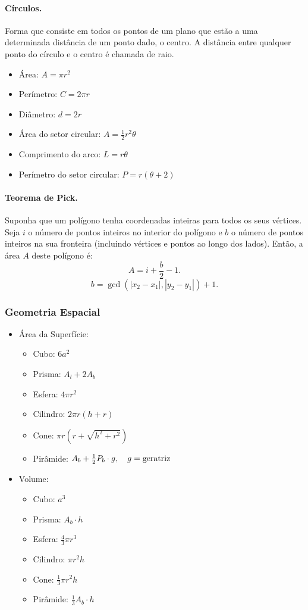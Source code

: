 \paragraph{Círculos.} Forma que consiste em todos os pontos de um plano que estão a uma determinada distância de um ponto dado, o centro. A distância entre qualquer ponto do círculo e o centro é chamada de raio.

	\begin{itemize}
		\item Área: $A = \pi r^2$
		\item Perímetro: $C = 2\pi r$
		\item Diâmetro: $d = 2r$
		\item Área do setor circular: $A = \frac{1}{2}r^2\theta$
		\item Comprimento do arco: $L = r\theta$
		\item Perímetro do setor circular: $P = r(\theta+2)$
	\end{itemize}

\paragraph{Teorema de Pick.} Suponha que um polígono tenha coordenadas inteiras para todos os seus vértices. Seja $i$ o número de pontos inteiros no interior do polígono e $b$ o número de pontos inteiros na sua fronteira (incluindo vértices e pontos ao longo dos lados). Então, a área $A$ deste polígono é:
$$A = i + \frac{b}{2} -1.$$
$$b = \gcd(|x_2-x_1|,|y_2-y_1|)+1.$$

\subsubsection{Geometria Espacial}


	\begin{itemize}
		\item Área da Superfície:
		\begin{itemize}
			\item Cubo: $6a^2$
			\item Prisma: $A_l + 2A_b$
			\item Esfera: $4\pi r^2$
			\item Cilindro: $2\pi r(h+r)$
			\item Cone: $\pi r(r+\sqrt{h^2+r^2})$
			\item Pirâmide: $A_b+\frac{1}{2}P_b \cdot g, \quad g=\textnormal{geratriz}$
		\end{itemize}

		\item Volume:
		\begin{itemize}
			\item Cubo: $a^3$
			\item Prisma: $A_b\cdot h$
			\item Esfera: $\frac{4}{3} \pi r^3$
			\item Cilindro: $\pi r^2h$
			\item Cone: $\frac{1}{3} \pi r^2 h$
			\item Pirâmide: $\frac{1}{3} A_b\cdot h$
		\end{itemize}

	\end{itemize}


